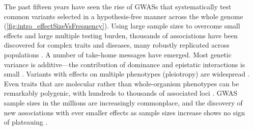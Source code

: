 \begin{outline}
The past fifteen years have seen the rise of \glspl{GWAS} that systematically test common variants selected in a hypothesis-free manner across the whole genome (\cref{fig:intro_effectSizeVsFrequency}).
Using large sample sizes to overcome small effects and large multiple testing burden, thousands of associations have been discovered for complex traits and diseases,
many robustly replicated across populations \autocite{visscher2012FiveYearsGWAS,visscher201710YearsGWAS}.
A number of take-home messages have emerged.
%
Most genetic variance is additive---the contribution of dominance and epistatic interactions is small \autocite{visscher2019Fisher1918Paper}.
Variants with effects on multiple phenotypes (pleiotropy) are widespread \autocite{visscher2012FiveYearsGWAS}.
Even traits that are molecular rather than whole-organism phenotypes can be remarkably polygenic, with hundreds to thousands of associated loci \autocite{sinnott-armstrong2020GWASThreeMolecular}.
\Gls{GWAS} sample sizes in the millions are increasingly commonplace,
and the discovery of new associations with ever smaller effects as sample sizes increase shows no sign of plateauing \autocite{tam2019BenefitsLimitationsGenomewide,crouch2020PolygenicInheritanceGWAS}.


\end{outline}
